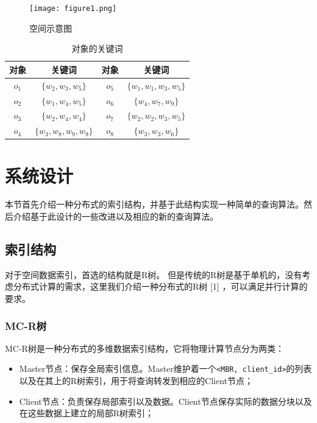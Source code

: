 \documentclass{elegantpaper}
\begin{document}
\begin{figure}[!ht]
	\centering
	\texttt{[image: figure1.png]}
	\caption{空间示意图\label{fig:figure1}}
\end{figure}

\begin{table}[!htbp]
    \small
    \centering
    \caption{对象的关键词}
      \begin{tabular}{cccc}
      对象&关键词&对象&关键词\\
      \hline
      $o_1$   & $\{w_2,w_3,w_5\}$ & $o_5$&$\{w_1,w_1,w_3,w_5\}$\\
      $o_2$   & $\{w_1,w_4,w_5\}$ & $o_6$&$\{w_4,w_7,w_9\}$\\
      $o_3$   & $\{w_2,w_4,w_4\}$ & $o_7$&$\{w_2,w_2,w_3,w_5\}$\\
      $o_4$   & $\{w_3,w_8,w_9,w_9\}$ & $o_8$&$\{w_3,w_3,w_6\}$\\
      \end{tabular}
\end{table}

\section{系统设计}

本节首先介绍一种分布式的索引结构，并基于此结构实现一种简单的查询算法。然后介绍基于此设计的一些改进以及相应的新的查询算法。

\subsection{索引结构}

对于空间数据索引，首选的结构就是R树。
但是传统的R树是基于单机的，没有考虑分布式计算的需求，这里我们介绍一种分布式的R树 [1] ，可以满足并行计算的要求。

\subsubsection{MC-R树}

MC-R树是一种分布式的多维数据索引结构，它将物理计算节点分为两类：

\begin{itemize}

    \item Master节点：保存全局索引信息。Master维护着一个\verb|<MBR, client_id>|的列表以及在其上的R树索引，用于将查询转发到相应的Client节点；
    
    \item Client节点：负责保存局部索引以及数据。Client节点保存实际的数据分块以及在这些数据上建立的局部R树索引；
    
\end{itemize}
\end{document}
